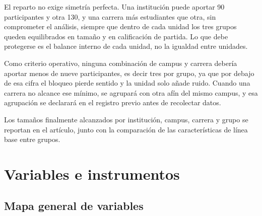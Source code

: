 \documentclass[12pt,a4paper,openany]{report}
\begin{document}
    El reparto no exige simetr\'ia perfecta. Una instituci\'on puede aportar 90 participantes y otra 130, y una carrera m\'as estudiantes que otra, sin comprometer el an\'alisis, siempre que dentro de cada unidad los tres grupos queden equilibrados en tama\~no y en calificaci\'on de partida. Lo que debe protegerse es el balance interno de cada unidad, no la igualdad entre unidades.
    
    Como criterio operativo, ninguna combinaci\'on de campus y carrera deber\'ia aportar menos de nueve participantes, es decir tres por grupo, ya que por debajo de esa cifra el bloqueo pierde sentido y la unidad solo a\~nade ruido. Cuando una carrera no alcance ese m\'inimo, se agrupar\'a con otra af\'in del mismo campus, y esa agrupaci\'on se declarar\'a en el registro previo antes de recolectar datos.
    
    Los tama\~nos finalmente alcanzados por instituci\'on, campus, carrera y grupo se reportan en el art\'iculo, junto con la comparaci\'on de las caracter\'isticas de l\'inea base entre grupos.
    
    \chapter{Variables e instrumentos}
    \label{cap:variables}
    
    \section{Mapa general de variables}
    
\end{document}
